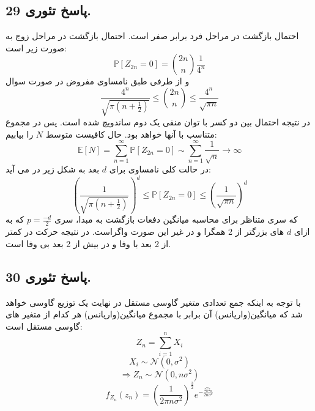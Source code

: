 \documentclass[]{article}
\begin{document}
\subsection{پاسخ تئوری 29.}
احتمال بازگشت در مراحل فرد برابر صفر است. احتمال بازگشت در مراحل زوج به صورت زیر است:
\begin{equation}
	\nonumber
	\mathbb{P}[Z_{2n} = 0] = \binom{2n}{n} \frac{1}{4^n}
\end{equation}
و از طرفی طبق نامساوی مفروض در صورت سوال
\begin{equation}
	\nonumber
	\frac{4^n}{\sqrt{\pi(n+\frac{1}{2})}} \leqslant \binom{2n}{n} \leqslant \frac{4^n}{\sqrt{\pi n}}
\end{equation}
در نتیجه احتمال بین دو کسر با توان منفی یک دوم ساندویچ شده است. پس در مجموع متناسب با آنها خواهد بود. حال کافیست متوسط 
$N$
را بیابیم:
\begin{equation}
	\nonumber
	\mathbb{E}[N] = \sum_{n = 1}^{\infty} \mathbb{P}[Z_{2n} = 0] \sim \sum_{n = 1}^{\infty} \frac{1}{\sqrt{n}} \longrightarrow \infty
\end{equation}
در حالت کلی نامساوی برای 
$d$
بعد به شکل زیر در می آید:
\begin{equation}
	\nonumber
	(\frac{1}{\sqrt{\pi(n+\frac{1}{2})}})^d \leqslant \mathbb{P}[Z_{2n} = 0] \leqslant (\frac{1}{\sqrt{\pi n}})^d
\end{equation}
که سری متناظر برای محاسبه میانگین دفعات بازگشت به مبدا، سری 
$p = \frac{-d}{2}$
 که به ازای 
 $d$
 های بزرگتر از 2 همگرا و در غیر این صورت واگراست. در نتیجه حرکت در کمتر از 2 بعد با وفا و در بیش از 2 بعد بی وفا است.
\newpage
\subsection{پاسخ تئوری 30.}
با توجه به اینکه جمع تعدادی متغیر گاوسی مستقل در نهایت یک توزیع گاوسی خواهد شد که میانگین(واریانس) آن برابر با مجموع میانگین(واریانس) هر کدام از متغیر های گاوسی مستقل است:
\begin{equation}
	\nonumber
	Z_n = \sum_{i = 1}^{n} X_i
\end{equation}
\begin{equation}
	\nonumber
	X_i \sim \mathcal{N}(0, \sigma^2)
\end{equation}
\begin{equation}
	\nonumber
	\Rightarrow Z_n \sim \mathcal{N}(0, n\sigma^2)
\end{equation}
\begin{equation}
	\nonumber
	f_{Z_n}(z_n) = (\frac{1}{2\pi n \sigma^2})^{\frac{3}{2}} e^{-\frac{z_n^T z_n}{2n\sigma^2}}
\end{equation}
\newpage
\end{document}
